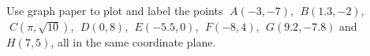 \documentclass{ximera}
\begin{document}
	\author{Stitz-Zeager}



\label{ExercisesforAppCartesianPlane}

\begin{problem}\label{cartexerciseone}
Use graph paper to plot and label the points $\;A(-3, -7)$,  $\;B(1.3, -2)$,  $\;C(\pi, \sqrt{10})$,  $\;D(0, 8)$,  $\;E(-5.5, 0)$,  $\;F(-8, 4)$, $\;G(9.2, -7.8)$ and $H(7, 5)$, all in the same coordinate plane.  

\begin{solution}
\end{solution}

\end{problem}
\end{document}

